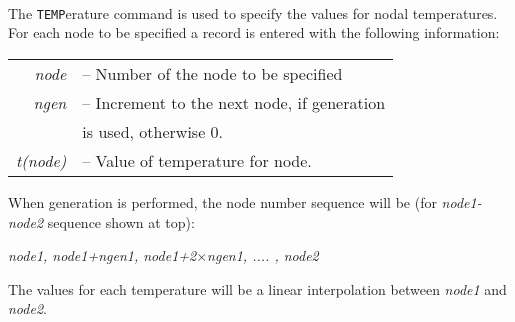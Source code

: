  \\{\smallskip}
 \\{\smallskip}
 \\{\smallskip}
\headb

The {\tt TEMP}erature command is used to specify the values for
nodal temperatures.  For each node to be specified a record
is entered with the following information:

\begin{center}
\begin{tabular}{r l}
\it node    &-- Number of the node to be specified \\
\it ngen    &-- Increment to the next node, if generation \\
            &\quad is used, otherwise 0. \\
\it t(node) &-- Value of temperature for node. \\
\end{tabular}
\end{center}
When generation is performed, the node number  sequence
will be (for {\it node1-node2} sequence shown at top):

\begin{center}
{\it node1, node1+ngen1, node1+2$\times$ngen1, .... , node2 }
\end{center}

The values for each temperature will be a linear  interpolation
between {\it node1} and {\it node2}. 
\vfil\eject
